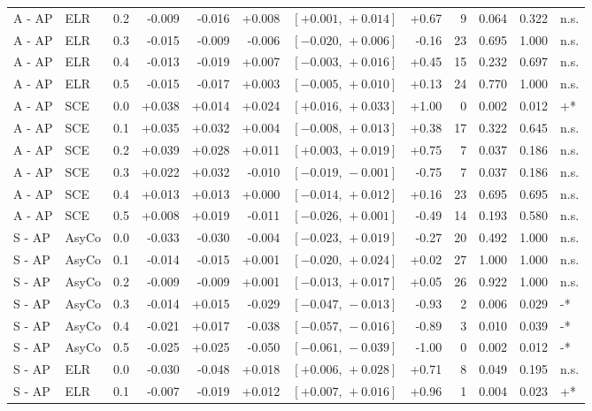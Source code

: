 \begin{landscape}
\begin{scriptsize}
\begin{longtable}{lllrrrrrrrrl}
A - AP & ELR & 0.2 & -0.009 & -0.016 & +0.008 & $[+0.001,\,+0.014]$ & +0.67 & 9 & 0.064 & 0.322 & n.s. \\
A - AP & ELR & 0.3 & -0.015 & -0.009 & -0.006 & $[-0.020,\,+0.006]$ & -0.16 & 23 & 0.695 & 1.000 & n.s. \\
A - AP & ELR & 0.4 & -0.013 & -0.019 & +0.007 & $[-0.003,\,+0.016]$ & +0.45 & 15 & 0.232 & 0.697 & n.s. \\
A - AP & ELR & 0.5 & -0.015 & -0.017 & +0.003 & $[-0.005,\,+0.010]$ & +0.13 & 24 & 0.770 & 1.000 & n.s. \\
A - AP & SCE & 0.0 & +0.038 & +0.014 & +0.024 & $[+0.016,\,+0.033]$ & +1.00 & 0 & 0.002 & 0.012 & +* \\
A - AP & SCE & 0.1 & +0.035 & +0.032 & +0.004 & $[-0.008,\,+0.013]$ & +0.38 & 17 & 0.322 & 0.645 & n.s. \\
A - AP & SCE & 0.2 & +0.039 & +0.028 & +0.011 & $[+0.003,\,+0.019]$ & +0.75 & 7 & 0.037 & 0.186 & n.s. \\
A - AP & SCE & 0.3 & +0.022 & +0.032 & -0.010 & $[-0.019,\,-0.001]$ & -0.75 & 7 & 0.037 & 0.186 & n.s. \\
A - AP & SCE & 0.4 & +0.013 & +0.013 & +0.000 & $[-0.014,\,+0.012]$ & +0.16 & 23 & 0.695 & 0.695 & n.s. \\
A - AP & SCE & 0.5 & +0.008 & +0.019 & -0.011 & $[-0.026,\,+0.001]$ & -0.49 & 14 & 0.193 & 0.580 & n.s. \\
S - AP & AsyCo & 0.0 & -0.033 & -0.030 & -0.004 & $[-0.023,\,+0.019]$ & -0.27 & 20 & 0.492 & 1.000 & n.s. \\
S - AP & AsyCo & 0.1 & -0.014 & -0.015 & +0.001 & $[-0.020,\,+0.024]$ & +0.02 & 27 & 1.000 & 1.000 & n.s. \\
S - AP & AsyCo & 0.2 & -0.009 & -0.009 & +0.001 & $[-0.013,\,+0.017]$ & +0.05 & 26 & 0.922 & 1.000 & n.s. \\
S - AP & AsyCo & 0.3 & -0.014 & +0.015 & -0.029 & $[-0.047,\,-0.013]$ & -0.93 & 2 & 0.006 & 0.029 & -* \\
S - AP & AsyCo & 0.4 & -0.021 & +0.017 & -0.038 & $[-0.057,\,-0.016]$ & -0.89 & 3 & 0.010 & 0.039 & -* \\
S - AP & AsyCo & 0.5 & -0.025 & +0.025 & -0.050 & $[-0.061,\,-0.039]$ & -1.00 & 0 & 0.002 & 0.012 & -* \\
S - AP & ELR & 0.0 & -0.030 & -0.048 & +0.018 & $[+0.006,\,+0.028]$ & +0.71 & 8 & 0.049 & 0.195 & n.s. \\
S - AP & ELR & 0.1 & -0.007 & -0.019 & +0.012 & $[+0.007,\,+0.016]$ & +0.96 & 1 & 0.004 & 0.023 & +* \\

\end{longtable}
\end{scriptsize}
\end{landscape}
